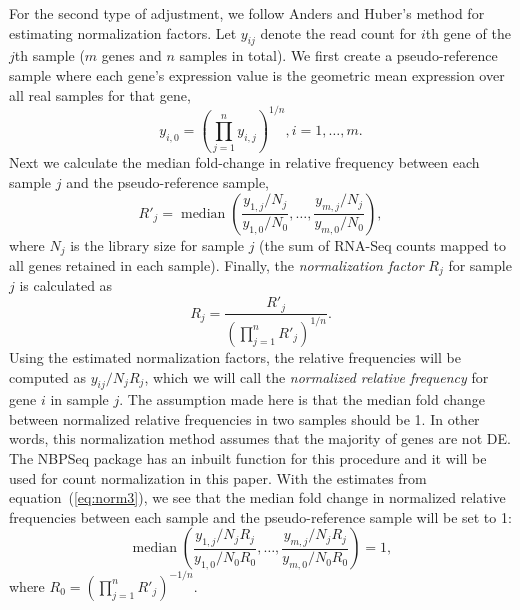 \documentclass[fleqn,10pt,lineno]{wlpeerj} %
\DeclareMathOperator{\median}{median}
\begin{document}
For the second type of adjustment, we follow Anders and Huber's method
\citep{anders2010differential} for estimating normalization factors.  Let $y_{ij}$ denote the read 
count for $i$th gene of the $j$th sample ($m$ genes and $n$ samples in total). We first
create a pseudo-reference sample where each gene's expression value is the geometric mean 
expression over all real samples for that gene,
\begin{equation}
y_{i,0} = (\prod_{j=1}^ny_{i,j})^{1/n},  i=1, \ldots, m. 
\end{equation} 
Next we calculate the median fold-change in relative frequency between each sample $j$ and the 
pseudo-reference sample,
\begin{equation}\label{eq:normfactors} 
R'_j = \median \left(\dfrac{y_{1,j}/N_j}{y_{1,0}/N_{0}}, \ldots, 
\dfrac{y_{m,j}/N_j}{y_{m,0}/N_{0}}\right),
\end{equation}
where $N_j$ is the library size for sample $j$ (the sum of RNA-Seq
counts mapped to all genes retained in each sample). Finally, the
\textit{normalization factor}  $R_j$ for sample $j$ is calculated as 
\begin{equation}
\label{eq:norm3}
R_j = \dfrac{R'_j}{(\prod_{j=1}^{n}R'_j)^{1/n}}.
\end{equation}
Using the estimated normalization factors, the relative frequencies will be
computed as $y_{ij}/{N_j R_j}$, which we will call the \textit{normalized relative frequency}
for gene $i$ in sample $j$. The assumption made here is that the
median fold change between normalized relative frequencies in two samples should be 1. In
other words, this normalization method assumes that the majority of genes are
not DE. The NBPSeq package \citep{di2014package} has an inbuilt function for
this procedure and it will be used for count normalization in this paper. With
the estimates from equation~(\ref{eq:norm3}), we see that the median fold
change in normalized relative frequencies between each sample and the pseudo-reference
sample will be set to 1:
\begin{equation}
\label{eq:medianfc}
\median \left(\dfrac{y_{1,j}/ N_jR_j}{y_{1,0}/N_{0}R_0}, \ldots,
\dfrac{y_{m,j}/N_j R_j}{y_{m,0}/N_{0}R_0} \right) = 1,
\end{equation}
where $R_0 = (\prod_{j=1}^{n}R'_j)^{-1/n}$.

\end{document}
